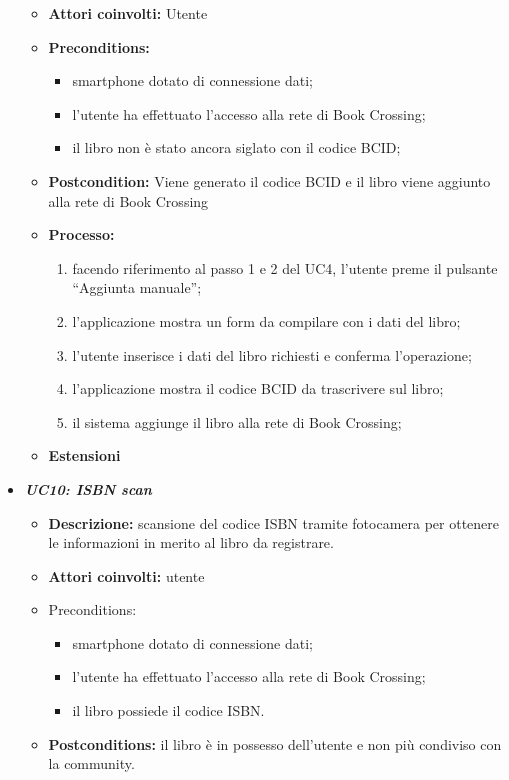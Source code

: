 \begin{itemize}
\begin{itemize}
		\item \textbf{Attori coinvolti:} Utente
		\item \textbf{Preconditions:}
		\begin{itemize}
			\item smartphone dotato di connessione dati;
			\item l’utente ha effettuato l’accesso alla rete di Book Crossing;
			\item il libro non è stato ancora siglato con il codice BCID;
		\end{itemize}
		\item \textbf{Postcondition:} Viene generato il codice BCID e il libro viene aggiunto alla rete di Book Crossing
		\item \textbf{Processo: }
		\begin{enumerate}
			\item facendo riferimento al passo 1 e 2 del UC4, l'utente preme il pulsante “Aggiunta manuale”;
			\item l’applicazione mostra un form da compilare con i dati del libro;
			\item l’utente inserisce i dati del libro richiesti e conferma l’operazione;
			\item l’applicazione mostra il codice BCID da trascrivere sul libro;
			\item il sistema aggiunge il libro alla rete di Book Crossing;
		\end{enumerate}
		\item \textbf{Estensioni}
	\end{itemize}
	\item \textbf{\textit{UC10: ISBN scan}}
	\begin{itemize}
		\item \textbf{Descrizione:} scansione del codice ISBN tramite fotocamera per ottenere le informazioni in merito al libro da registrare.
		\item \textbf{Attori coinvolti:} utente
		\item {Preconditions:} 
		\begin{itemize}
			\item smartphone dotato di connessione dati;
			\item l’utente ha effettuato l’accesso alla rete di Book Crossing;
			\item il libro possiede il codice ISBN.
		\end{itemize}
		\item \textbf{Postconditions:} il libro è in possesso dell'utente e non più condiviso con la community.

\end{itemize}
\end{itemize}
